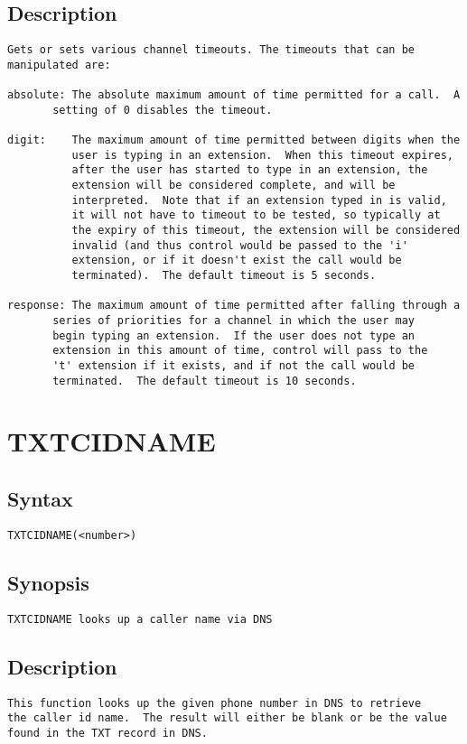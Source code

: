 \subsection{Description}
\begin{verbatim}
Gets or sets various channel timeouts. The timeouts that can be
manipulated are:

absolute: The absolute maximum amount of time permitted for a call.  A
	   setting of 0 disables the timeout.

digit:    The maximum amount of time permitted between digits when the
          user is typing in an extension.  When this timeout expires,
          after the user has started to type in an extension, the
          extension will be considered complete, and will be
          interpreted.  Note that if an extension typed in is valid,
          it will not have to timeout to be tested, so typically at
          the expiry of this timeout, the extension will be considered
          invalid (and thus control would be passed to the 'i'
          extension, or if it doesn't exist the call would be
          terminated).  The default timeout is 5 seconds.

response: The maximum amount of time permitted after falling through a
	   series of priorities for a channel in which the user may
	   begin typing an extension.  If the user does not type an
	   extension in this amount of time, control will pass to the
	   't' extension if it exists, and if not the call would be
	   terminated.  The default timeout is 10 seconds.

\end{verbatim}


\section{TXTCIDNAME}
\subsection{Syntax}
\begin{verbatim}
TXTCIDNAME(<number>)
\end{verbatim}
\subsection{Synopsis}
\begin{verbatim}
TXTCIDNAME looks up a caller name via DNS
\end{verbatim}
\subsection{Description}
\begin{verbatim}
This function looks up the given phone number in DNS to retrieve
the caller id name.  The result will either be blank or be the value
found in the TXT record in DNS.

\end{verbatim}


